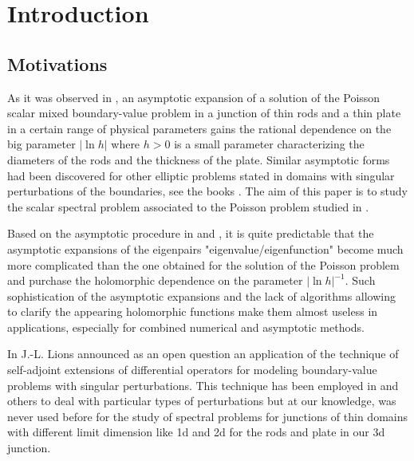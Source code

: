 \documentclass[11pt]{article}%
\numberwithin{equation}{section}
\begin{document}
\section{Introduction\label{sect1}}

\subsection{Motivations\label{sect1.1}}

As it was observed in \cite{BuCaNa1}, an asymptotic expansion of a solution of
the Poisson scalar mixed boundary-value problem in a junction of thin rods and
a thin plate in a certain range of physical parameters gains the rational
dependence on the big parameter $|\ln h|$ where $h>0$ is a small parameter
characterizing the diameters of the rods and the thickness of the plate.
Similar asymptotic forms had been discovered for other elliptic problems
stated in domains with singular perturbations of the boundaries, see the books
\cite{MaNaPl, Ilin, KoMaMo}. The aim of this paper is to study the scalar
spectral problem associated to the Poisson problem studied in \cite{BuCaNa1}.

Based on the asymptotic procedure in \cite[\S 2.2.4, \S 5.5.2, \S 9.1.3]%
{MaNaPl} and \cite{na285, BuCaNa1}, it is quite predictable that the
asymptotic expansions of the eigenpairs "eigenvalue/eigenfunction" become much
more complicated than the one obtained for the solution of the Poisson problem
and purchase the holomorphic dependence on the parameter $|\ln h|^{-1}$. Such
sophistication of the asymptotic expansions and the lack of algorithms
allowing to clarify the appearing holomorphic functions make them almost
useless in applications, especially for combined numerical and asymptotic methods.

In \cite{Lions} J.-L. Lions announced as an open question an application of
the technique of self-adjoint extensions of differential operators for
modeling boundary-value problems with singular perturbations. This technique
has been employed in \cite{na344, na389, na576} and others to deal with
particular types of perturbations but at our knowledge, was never used before
for the study of spectral problems for junctions of thin domains with
different limit dimension like 1d and 2d for the rods and plate in our 3d junction.
\end{document}
